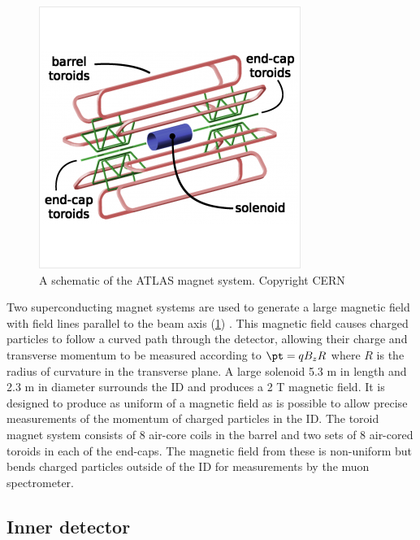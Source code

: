 \begin{figure}[t]
\includegraphics{atlas_magnets.png}
\caption{A schematic of the ATLAS magnet system. Copyright CERN}
\label{fig:atlas_magnets}
\end{figure}

Two superconducting magnet systems are used to generate a large magnetic field with field lines parallel to the beam axis (\cref{fig:atlas_magnets}) \cite{ATLAS:1997ae}. %
This magnetic field causes charged particles to follow a curved path through the detector, allowing their charge and transverse momentum to be measured according to \(  \pt = q B_z R\) where $R$ is the radius of curvature in the transverse plane.
A large solenoid 5.3 m in length and 2.3 m in diameter surrounds the ID and produces a 2 T magnetic field.
It is designed to produce as uniform of a magnetic field as is possible to allow precise measurements of the momentum of charged particles in the ID.
The toroid magnet system consists of 8 air-core coils in the barrel and two sets of 8 air-cored toroids in each of the end-caps.
The magnetic field from these is non-uniform but bends charged particles outside of the ID for measurements by the muon spectrometer.

\subsection{Inner detector}
\label{subsec:atlas_id}

